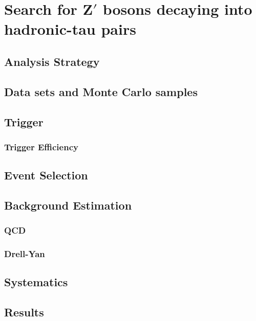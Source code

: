 \chapter[Analysis]{Search for Z$'$ bosons decaying into hadronic-tau pairs}
\label{chap:Analysis}

\section{Analysis Strategy}
\label{sec:Strategy}

\section{Data sets and Monte Carlo samples}
\label{sec:Samples}

\section{Trigger}
\label{sec:Trigger}

\subsection{Trigger Efficiency}
\label{subsec:TriggerEff}

\section{Event Selection}
\label{sec:EventSelection}

\section{Background Estimation}
\label{sec:BackgroundEstimation}

\subsection{QCD}
\label{subsec:QCD}

\subsection{Drell-Yan}
\label{subsec:QDY}

\section{Systematics}
\label{sec:Systematics}

\section{Results}
\label{sec:Results}
